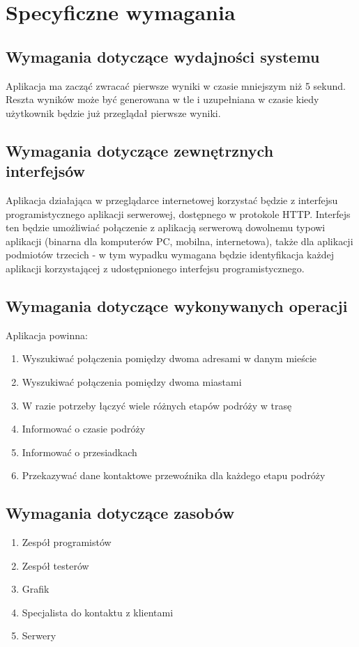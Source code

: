 \documentclass[12pt,a4paper]{report}
\begin{document}
\section{Specyficzne wymagania}
\subsection{Wymagania dotyczące wydajności systemu}
	Aplikacja ma zacząć zwracać pierwsze wyniki w czasie mniejszym niż 5 sekund. Reszta wyników może być generowana w tle i uzupełniana w czasie kiedy użytkownik będzie już przeglądał pierwsze wyniki.
\subsection{Wymagania dotyczące zewnętrznych interfejsów}
Aplikacja działająca w przeglądarce internetowej korzystać będzie z interfejsu programistycznego aplikacji serwerowej, dostępnego w protokole HTTP. Interfejs ten będzie umożliwiać połączenie z aplikacją serwerową dowolnemu typowi aplikacji (binarna dla komputerów PC, mobilna, internetowa), także dla aplikacji podmiotów trzecich - w tym wypadku wymagana będzie identyfikacja każdej aplikacji korzystającej z udostępnionego interfejsu programistycznego.
\subsection{Wymagania dotyczące wykonywanych operacji}
	Aplikacja powinna:
	\begin{enumerate}	
		\item Wyszukiwać połączenia pomiędzy dwoma adresami w danym mieście
		\item Wyszukiwać połączenia pomiędzy dwoma miastami
		\item W razie potrzeby łączyć wiele różnych etapów podróży w trasę
		\item Informować o czasie podróży
		\item Informować o przesiadkach
		\item Przekazywać dane kontaktowe przewoźnika dla każdego etapu podróży 
	\end{enumerate}
\subsection{Wymagania dotyczące zasobów}
\begin{enumerate}
	\item Zespół programistów
	\item Zespół testerów
	\item Grafik
	\item Specjalista do kontaktu z klientami
	\item Serwery
\end{enumerate}
\end{document}
